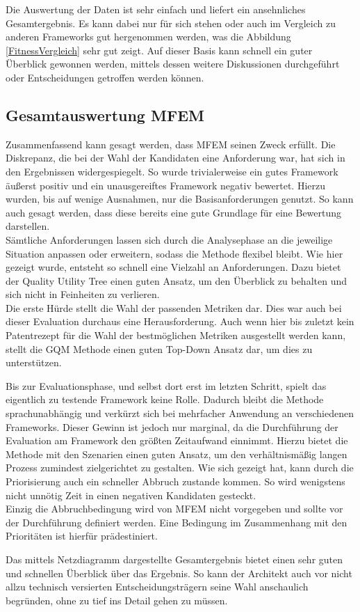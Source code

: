 Die Auswertung der Daten ist sehr einfach und liefert ein ansehnliches Gesamtergebnis. Es kann dabei nur für sich stehen oder auch im Vergleich zu anderen Frameworks gut hergenommen werden, was die Abbildung \ref{FitnessVergleich} sehr gut zeigt. Auf dieser Basis kann schnell ein guter Überblick gewonnen werden, mittels dessen weitere Diskussionen durchgeführt oder Entscheidungen getroffen werden können.

\subsection{Gesamtauswertung \ac*{MFEM}}

Zusammenfassend kann gesagt werden, dass \ac{MFEM} seinen Zweck erfüllt. Die Diskrepanz, die bei der Wahl der Kandidaten eine Anforderung war, hat sich in den Ergebnissen widergespiegelt. So wurde trivialerweise ein gutes Framework äußerst positiv und ein unausgereiftes Framework negativ bewertet. Hierzu wurden, bis auf wenige Ausnahmen, nur die Basisanforderungen genutzt. So kann auch gesagt werden, dass diese bereits eine gute Grundlage für eine Bewertung darstellen.\\
Sämtliche Anforderungen lassen sich durch die Analysephase an die jeweilige Situation anpassen oder erweitern, sodass die Methode flexibel bleibt. Wie hier gezeigt wurde, entsteht so schnell eine Vielzahl an Anforderungen. Dazu bietet der Quality Utility Tree einen guten Ansatz, um den Überblick zu behalten und sich nicht in Feinheiten zu verlieren.\\
Die erste Hürde stellt die Wahl der passenden Metriken dar. Dies war auch bei dieser Evaluation durchaus eine Herausforderung. Auch wenn hier bis zuletzt kein Patentrezept für die Wahl der bestmöglichen Metriken ausgestellt werden kann, stellt die \ac{GQM} Methode einen guten Top-Down Ansatz dar, um dies zu unterstützen.

Bis zur Evaluationsphase, und selbst dort erst im letzten Schritt, spielt das eigentlich zu testende Framework keine Rolle. Dadurch bleibt die Methode sprachunabhängig und verkürzt sich bei mehrfacher Anwendung an verschiedenen Frameworks. Dieser Gewinn ist jedoch nur marginal, da die Durchführung der Evaluation am Framework den größten Zeitaufwand einnimmt. Hierzu bietet die Methode mit den Szenarien einen guten Ansatz, um den verhältnismäßig langen Prozess zumindest zielgerichtet zu gestalten. Wie sich gezeigt hat, kann durch die Priorisierung auch ein schneller Abbruch zustande kommen. So wird wenigstens nicht unnötig Zeit in einen negativen Kandidaten gesteckt.\\
Einzig die Abbruchbedingung wird von \ac{MFEM} nicht vorgegeben und sollte vor der Durchführung definiert werden. Eine Bedingung im Zusammenhang mit den Prioritäten ist hierfür prädestiniert.

Das mittels Netzdiagramm dargestellte Gesamtergebnis bietet einen sehr guten und schnellen Überblick über das Ergebnis. So kann der Architekt auch vor nicht allzu technisch versierten Entscheidungsträgern seine Wahl anschaulich begründen, ohne zu tief ins Detail gehen zu müssen.     












